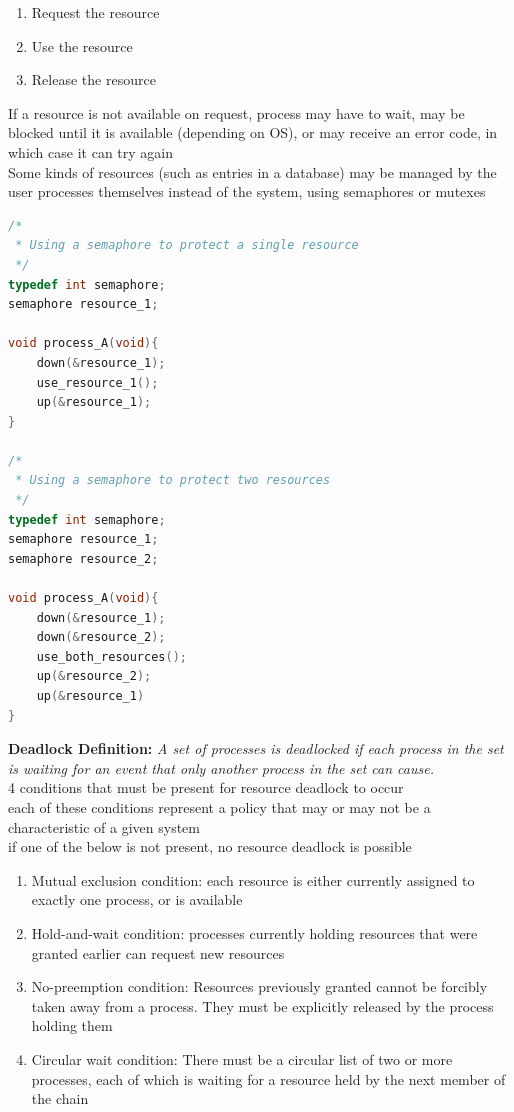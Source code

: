 \documentclass{article}
\begin{document}
\begin{enumerate}
	\item Request the resource
	\item Use the resource
	\item Release the resource
\end{enumerate}
If a resource is not available on request, process may have to wait, may be blocked until it is available (depending on OS), or may receive an error code, in which case it can try again
\\Some kinds of resources (such as entries in a database) may be managed by the user processes themselves instead of the system, using semaphores or mutexes
\begin{lstlisting}[language=C]
/*
 * Using a semaphore to protect a single resource
 */
typedef int semaphore;
semaphore resource_1;

void process_A(void){
	down(&resource_1);
	use_resource_1();
	up(&resource_1);
}

/*
 * Using a semaphore to protect two resources
 */
typedef int semaphore;
semaphore resource_1;
semaphore resource_2;

void process_A(void){
	down(&resource_1);
	down(&resource_2);
	use_both_resources();
	up(&resource_2);
	up(&resource_1)
}
\end{lstlisting}
\textbf{Deadlock Definition:} \textit{A set of processes is deadlocked if each process in the set is waiting for an event that only another process in the set can cause.} 
\\4 conditions that must be present for resource deadlock to occur
\\each of these conditions represent a policy that may or may not be a characteristic of a given system
\\if one of the below is not present, no resource deadlock is possible
\begin{enumerate}
	\item Mutual exclusion condition: each resource is either currently assigned to exactly one process, or is available
	\item Hold-and-wait condition: processes currently holding resources that were granted earlier can request new resources
	\item No-preemption condition: Resources previously granted cannot be forcibly taken away from a process. They must be explicitly released by the process holding them
	\item Circular wait condition: There must be a circular list of two or more processes, each of which is waiting for a resource held by the next member of the chain
\end{enumerate}
\end{document}

